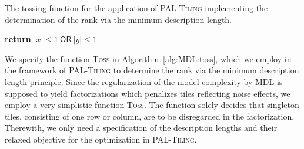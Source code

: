 \begin{algorithm}[t]
\caption{The tossing function for the application of \textsc{PAL-Tiling} implementing the determination of the rank via the minimum description length.} 
\begin{algorithmic}[1]
  	\State \textbf{return} $\lvert x\rvert \leq 1\ \mathsf{OR}\ \lvert y\rvert \leq 1$ 
  \EndFunction
\end{algorithmic}
\label{alg:MDL:toss}
\end{algorithm}
We specify the function \textsc{Toss} in Algorithm~\ref{alg:MDL:toss}, which we employ in the framework of \textsc{PAL-Tiling} to determine the rank via the minimum description length principle. Since the regularization of the model complexity by MDL is supposed to yield factorizations which penalizes tiles reflecting noise effects, we employ a very simplistic function \textsc{Toss}. The function solely decides that singleton tiles, consisting of one row or column, are to be disregarded in the factorization. Therewith, we only need a specification of the description lengths and their relaxed objective for the optimization in \textsc{PAL-Tiling}.
